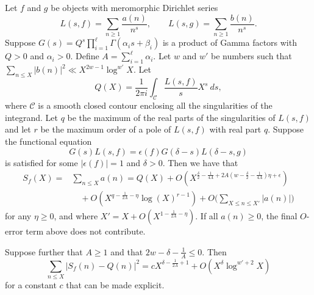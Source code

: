 \begin{theorem}
  Let $f$ and $g$ be objects with meromorphic Dirichlet series
  \begin{equation*}
    L(s,f) = \sum_{n \geq 1} \frac{a(n)}{n^s}, \qquad L(s,g)=\sum_{n\geq 1}
    \frac{b(n)}{n^s}.
  \end{equation*}
  Suppose $G(s) = Q^s\prod_{i=1}^\ell \Gamma(\alpha_i s + \beta_i)$ is a product of Gamma
  factors with $Q>0$ and $\alpha_i > 0$.
  Define $A = \sum_{i=1}^\ell \alpha_i$.
  Let $w$ and $w'$ be numbers such that $\sum_{n \leq X} \lvert b(n) \rvert^2 \ll X^{2w -
  1} \log^{w'} X$.
  Let
  \begin{equation*}
    Q(X) = \frac{1}{2\pi i} \int_{\mathcal{C}} \frac{L(s,f)}{s} X^s \ ds,
  \end{equation*}
  where $\mathcal{C}$ is a smooth closed contour enclosing all the singularities of the
  integrand.
  Let $q$ be the maximum of the real parts of the singularities of $L(s,f)$ and let $r$ be
  the maximum order of a pole of $L(s,f)$ with real part $q$.
  Suppose the functional equation
  \begin{equation}\label{eq:basic_feq}
    G(s)L(s,f) = \epsilon(f) G(\delta-s)L(\delta-s,g)
  \end{equation}
  is satisfied for some $\lvert \epsilon(f) \rvert = 1$ and $\delta >0$.
  Then we have that
  \begin{equation}
    \begin{split}\label{eq:CN_L1}
      S_f(X) =& \sum_{n\leq X} a(n) =
      Q(X) + O(X^{\frac{\delta}{2}-\frac{1}{4A}+2A(w-\frac{\delta}{2}-\frac{1}{4A})\eta +
      \epsilon}) \\
      & \quad + O(X^{q-\frac{1}{2A}-\eta}\log(X)^{r-1})+O\bigg( \sum_{X \leq n \leq X'}
    |a(n)| \bigg)
    \end{split}
  \end{equation}
  for any $\eta \geq 0$, and where $X' =X+O(X^{1-\frac{1}{2A}-\eta})$.
  If all $a(n) \geq 0$, the final $O$-error term above does not contribute.

  Suppose further that $A \geq 1$ and that $2w - \delta - \frac{1}{A} \leq 0$.
  Then
  \begin{equation*}
    \sum_{n \leq X} \lvert S_f(n) - Q(n) \rvert^2 = cX^{\delta - \frac{1}{2A} + 1} +
    O(X^{\delta} \log^{w' + 2} X)
  \end{equation*}
  for a constant $c$ that can be made explicit.
\end{theorem}

